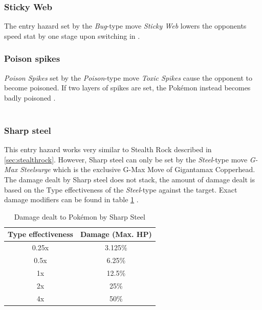 \subsubsection{Sticky Web}
The entry hazard set by the \textit{Bug}-type move \textit{Sticky Web} lowers the
opponents speed stat by one stage upon switching in \cite{Bulbapedia:StickyWeb}. \\

\subsubsection{Poison spikes}
\label{sec:poison-spikes}
\textit{Poison Spikes} set by the \textit{Poison}-type move \textit{Toxic Spikes}
cause the opponent to become poisoned. If two layers of spikes are set, the
Pokémon instead becomes badly poisoned \cite{Bulbapedia:ToxicSpikes}. \\
 \\

\subsubsection{Sharp steel}
This entry hazard works very similar to Stealth Rock described in \ref{sec:stealthrock}.
However, Sharp steel can only be set by the \textit{Steel}-type move
\textit{G-Max Steelsurge} which is the exclusive G-Max Move of Gigantamax Copperhead.
The damage dealt by Sharp steel does not stack, the amount of damage dealt is
based on the Type effectiveness of the \textit{Steel}-type against the target.
Exact damage modifiers can be found in table \ref{tab:sharp-steel-damage}
\cite{Bulbapedia:GMaxSteelsurge}.
\begin{table}[h]
	\label{tab:sharp-steel-damage}
	\centering
	\begin{tabular}{|c|c|}
		\hline
		\textbf{Type effectiveness} & \textbf{Damage (Max. \ac{HP}}) \\
		\hline 
		0.25x & 3.125\% \\ 
		\hline 
		0.5x &  6.25\% \\ 
		\hline 
		1x & 12.5\% \\
		\hline
		2x & 25\% \\
		\hline
		4x & 50\% \\
		\hline
	\end{tabular} 
	\caption{Damage dealt to Pokémon by Sharp Steel\cite{Bulbapedia:GMaxSteelsurge}}
\end{table}

